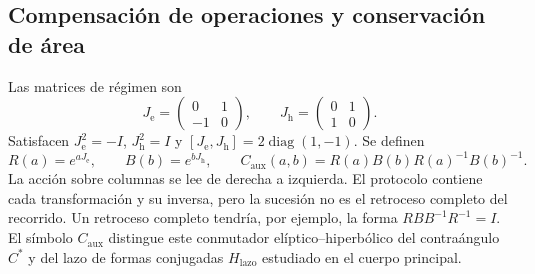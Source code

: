 \subsection{Compensación de operaciones y conservación de área}
\label{md:aux:conmutador}

Las matrices de régimen son
\begin{equation}
 J_{\mathrm e}=\begin{pmatrix}0&1\\-1&0\end{pmatrix},\qquad
 J_{\mathrm h}=\begin{pmatrix}0&1\\1&0\end{pmatrix}.
 \label{md:aux:regimenes}
\end{equation}
Satisfacen $J_{\mathrm e}^2=-I$, $J_{\mathrm h}^2=I$ y
$[J_{\mathrm e},J_{\mathrm h}]=2\operatorname{diag}(1,-1)$.
Se definen
\begin{equation}
 R(a)=e^{aJ_{\mathrm e}},\qquad B(b)=e^{bJ_{\mathrm h}},\qquad
 C_{\mathrm{aux}}(a,b)=R(a)B(b)R(a)^{-1}B(b)^{-1}.
 \label{md:aux:def-compensado}
\end{equation}
La acción sobre columnas se lee de derecha a izquierda. El protocolo
contiene cada transformación y su inversa, pero la sucesión no es
el retroceso completo del recorrido. Un retroceso completo tendría,
por ejemplo, la forma $RBB^{-1}R^{-1}=I$. El símbolo
$C_{\mathrm{aux}}$ distingue este conmutador elíptico--hiperbólico
del contraángulo $C^*$ y del lazo de formas conjugadas
$H_{\mathrm{lazo}}$ estudiado en el cuerpo principal.

